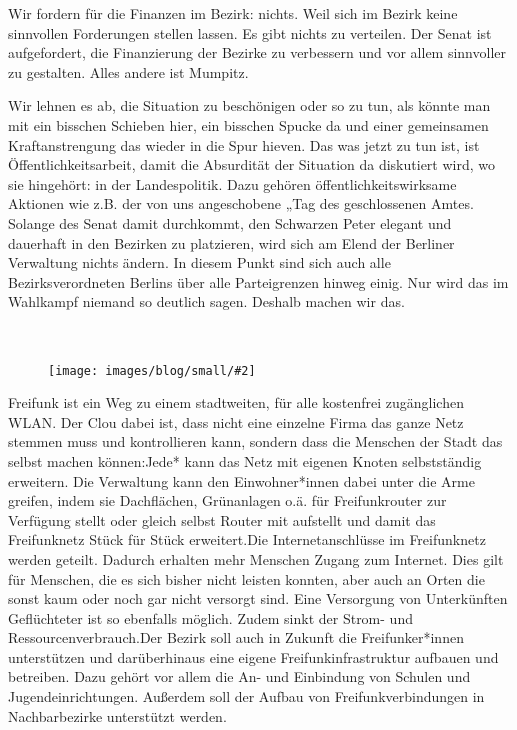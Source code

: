 \documentclass[a4paper,10pt]{article}
\newcommand{\mysection}[1]{{\vspace{1cm}\noindent\color{gray}{\ttfamily\LARGE\raggedright #1}\\\medskip}}
\newcommand{\abschnitt}[2]{%
\mysection{\raggedright #1}%
\begin{figure}[t]%
\vspace*{-2.7cm}%
\hspace*{-2.1cm}%
\texttt{[image: images/blog/small/\#2]} %
\end{figure}%
}
\begin{document}
Wir fordern für die Finanzen im Bezirk: nichts. Weil sich im Bezirk
keine sinnvollen Forderungen stellen lassen. Es gibt nichts zu
verteilen. Der Senat ist aufgefordert, die Finanzierung der Bezirke zu
verbessern und vor allem sinnvoller zu gestalten. Alles andere ist
Mumpitz.

Wir lehnen es ab, die Situation zu beschönigen oder so zu tun, als
könnte man mit ein bisschen Schieben hier, ein bisschen Spucke da und
einer gemeinsamen Kraftanstrengung das wieder in die Spur hieven. Das
was jetzt zu tun ist, ist Öffentlichkeitsarbeit, damit die Absurdität
der Situation da diskutiert wird, wo sie hingehört: in der
Landespolitik. Dazu gehören öffentlichkeitswirksame Aktionen wie z.B.
der von uns angeschobene „Tag des geschlossenen Amtes{\grqq}. Solange des
Senat damit durchkommt, den Schwarzen Peter elegant und dauerhaft in den
Bezirken zu platzieren, wird sich am Elend der Berliner Verwaltung
nichts ändern. In diesem Punkt sind sich auch alle Bezirksverordneten
Berlins über alle Parteigrenzen hinweg einig. Nur wird das im Wahlkampf
niemand so deutlich sagen. Deshalb machen wir das.

\clearpage
\abschnitt{Freifunk}{routerallerlaender.jpg}

\enlargethispage{-1em}
Freifunk ist ein Weg zu einem stadtweiten, für alle kostenfrei
zugänglichen WLAN. Der Clou dabei ist, dass nicht eine einzelne Firma
das ganze Netz stemmen muss und kontrollieren kann, sondern dass die
Menschen der Stadt das selbst machen können:Jede* kann das Netz mit
eigenen Knoten selbstständig erweitern. Die Verwaltung kann den
Einwohner*innen dabei unter die Arme greifen, indem sie
Dachflächen, Grünanlagen o.ä. für Freifunkrouter zur Verfügung stellt
oder gleich selbst Router mit aufstellt und damit das Freifunknetz Stück
für Stück erweitert.Die Internetanschlüsse im Freifunknetz werden
geteilt. Dadurch erhalten mehr Menschen Zugang zum Internet. Dies gilt
für Menschen, die es sich bisher nicht leisten konnten, aber auch an
Orten die sonst kaum oder noch gar nicht versorgt sind. Eine Versorgung
von Unterkünften Geflüchteter ist so ebenfalls möglich. Zudem sinkt der
Strom- und Ressourcenverbrauch.Der Bezirk soll auch in Zukunft die
Freifunker*innen unterstützen und darüberhinaus eine eigene
Freifunkinfrastruktur aufbauen und betreiben. Dazu gehört vor allem die
An- und Einbindung von Schulen und Jugendeinrichtungen. Außerdem soll
der Aufbau von Freifunkverbindungen in Nachbarbezirke unterstützt
werden.


\mysection{Soziales}
\end{document}
